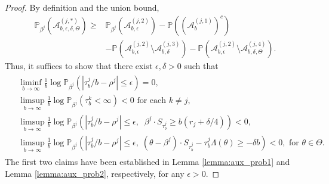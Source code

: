 \documentclass[10pt,a4paper]{amsart}
\newcommand{\Pro}{{\mathbb{P}}}
\begin{document}
\begin{proof}
By definition and the union bound,
\begin{align*}
\Pro_{\beta^j}\left(\mathcal{A}_{b,\epsilon,\delta,\Theta}^{(j,*)} \right) \geq &\Pro_{\beta^j}\left(\mathcal{A}_{b,\epsilon}^{(j,2)}\right) - 
\Pro\left( \left(\mathcal{A}_{b}^{(j,1)}\right)^c \right) \\
&- \Pro\left( \mathcal{A}_{b,\epsilon}^{(j,2)}  \setminus \mathcal{A}_{b,\delta}^{(j,3)} \right) -
\Pro\left( \mathcal{A}_{b,\epsilon}^{(j,2)} \setminus \mathcal{A}_{b,\delta,\Theta}^{(j,4)} \right).
\end{align*}
Thus, it suffices to show that there exist $\epsilon,\delta > 0$ such that
\begin{align}
\begin{split}
     &\liminf_{b \to \infty}  \frac{1}{b} \log    \Pro_{\beta^j}\left(\left|{\tau_b^j}/{b} - \rho^{j}\right| \leq \epsilon  \right) = 0, \\
 & \limsup_{b \to \infty}  \frac{1}{b} \log    \Pro_{\beta^j}\left(\tau_b^{k} < \infty \right) < 0  \text{ for each } k \neq j, \\
  & \limsup_{b \to \infty}  \frac{1}{b} \log    \Pro_{\beta^j}\left(\left|{\tau_b^j}/{b} - \rho^{j}\right| \leq   \epsilon , \;\; \beta^j \cdot S_{\tau_b^j} \geq  b(r_j + \delta/4) \right) < 0, \\
   & \limsup_{b \to \infty}  \frac{1}{b} \log    \Pro_{\beta^j}\left(\left|{\tau_b^j}/{b} - \rho^{j}\right| \leq \epsilon,\; (\theta-\beta^j) \cdot S_{\tau_b^j} - \tau_b^j \Lambda(\theta)  \geq 
-\delta b  \right) < 0, \text{ for } \theta \in \Theta.
\end{split}
\label{eqref:aux_overall}
\end{align}
The first two claims have been established in Lemma \ref{lemma:aux_prob1} and Lemma \ref{lemma:aux_prob2}, respectively, for any $\epsilon > 0$.


\end{proof}
\end{document}

